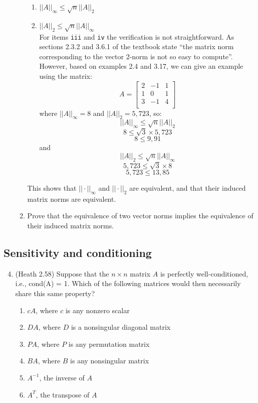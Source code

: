 \documentclass{article}
\begin{document}
\begin{enumerate}
\begin{enumerate}
\begin{enumerate}
      \item $||A||_\infty \leq \sqrt{n} ||A||_2$
      \item $||A||_2 \leq \sqrt{n} ||A||_\infty$\\
      For items \texttt{iii} and \texttt{iv} the verification is not straightforward.  As sections 2.3.2 and 3.6.1 of the textbook state ``the matrix norm corresponding to the vector 2-norm is not so easy to compute''.  However, based on examples 2.4 and 3.17, we can give an example using the matrix:
      $$ A=\left[\begin{array}{ccc} 2&-1&1 \\ 1&0&1 \\ 3&-1&4 \\ \end{array} \right] $$
      where $||A||_\infty=8$ and $||A||_2=5,723$, so:
      $$||A||_\infty \leq \sqrt{n} ||A||_2$$
      $$8 \leq \sqrt{3}\times5,723$$
      $$8 \leq 9,91$$
      and
      $$||A||_2 \leq \sqrt{n} ||A||_\infty$$
      $$5,723 \leq \sqrt{3}\times8$$
      $$5,723 \leq 13,85$$
    \end{enumerate}
  This shows that $||\cdot||_\infty$ and $||\cdot||_2$ are equivalent, and that their induced matrix norms are equivalent.
  \item Prove that the equivalence of two vector norms implies the equivalence of their induced matrix norms.
  \end{enumerate}
\end{enumerate}

\subsection*{Sensitivity and conditioning}
\begin{enumerate}
\setcounter{enumi}{3}
\item (Heath 2.58) Suppose that the $n \times n$ matrix $A$ is perfectly well-conditioned, i.e., cond(A) = 1.  Which of the following matrices would then necessarily share this same
  property?
\begin{enumerate}
\item $cA$, where $c$ is any nonzero scalar \Large \checkmark \normalsize
\item $DA$, where $D$ is a nonsingular diagonal matrix
\item $PA$, where $P$ is any permutation matrix \Large \checkmark \normalsize
\item $BA$, where $B$ is any nonsingular matrix
\item $A^{-1}$, the inverse of $A$ \Large \checkmark \normalsize
\item $A^T$, the transpose of $A$
\end{enumerate}
\end{enumerate}
\end{document}

